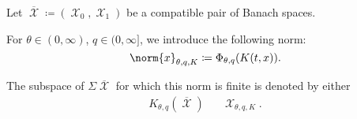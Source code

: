 \begin{definition}\label{def:k_functional_interpolation_space}
  Let \( \overline{\mscrX} \coloneqq ( \mscrX_0, \mscrX_1 ) \) be a compatible pair of Banach spaces.

  For \( \theta \in (0, \infty) \), \( q \in (0, \infty] \), we introduce the following norm:
  \begin{equation}\label{eq:def:k_functional_interpolation_space/norm}
    \norm{x}_{\theta,q,K} \coloneqq \Phi_{\theta,q}(K(t, x)).
  \end{equation}

  The subspace of \( \Sigma\overline{\mscrX} \) for which this norm is finite is denoted by either
  \begin{align*}
    K_{\theta,q}(\overline{\mscrX})
    &&
    \mscrX_{\theta,q,K}.
  \end{align*}
\end{definition}

